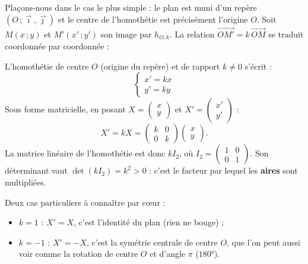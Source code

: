 \documentclass[11pt]{article}
\newcommand{\cle}[1]{{\popxbold\color{popdark}#1}}
\begin{document}
Plaçons-nous dans le cas le plus simple : le plan est muni d'un repère $(O\,;\vec{\imath},\vec{\jmath})$ et le centre de l'homothétie est précisément l'origine $O$. Soit $M(x\,;y)$ et $M'(x'\,;y')$ son image par $h_{O,k}$. La relation $\overrightarrow{OM'} = k\,\overrightarrow{OM}$ se traduit coordonnée par coordonnée :

\begin{propriete}
L'homothétie de centre $O$ (origine du repère) et de rapport $k \neq 0$ s'écrit :
\[ \begin{cases} x' = kx \\ y' = ky \end{cases} \]
Sous forme matricielle, en posant $X = \begin{pmatrix} x \\ y \end{pmatrix}$ et $X' = \begin{pmatrix} x' \\ y' \end{pmatrix}$ :
\[ X' = kX = \begin{pmatrix} k & 0 \\ 0 & k \end{pmatrix} \begin{pmatrix} x \\ y \end{pmatrix}. \]
La \cle{matrice linéaire} de l'homothétie est donc $kI_2$, où $I_2 = \begin{pmatrix} 1 & 0 \\ 0 & 1 \end{pmatrix}$. Son déterminant vaut $\det(kI_2) = k^2 > 0$ : c'est le facteur par lequel les \textbf{aires} sont multipliées.
\end{propriete}

Deux cas particuliers à connaître par cœur :
\begin{itemize}
\item $k = 1$ : $X' = X$, c'est l'\cle{identité} du plan (rien ne bouge) ;
\item $k = -1$ : $X' = -X$, c'est la \cle{symétrie centrale} de centre $O$, que l'on peut aussi voir comme la rotation de centre $O$ et d'angle $\pi$ ($180°$).
\end{itemize}
\end{document}

